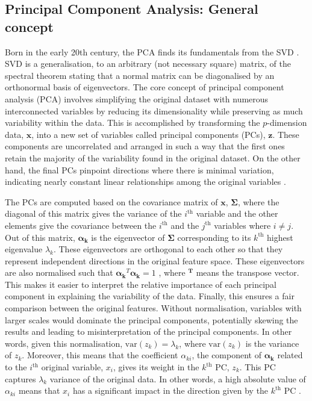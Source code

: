 \subsection{Principal Component Analysis: General concept}
\label{subsec:meth:PCA:PCA}
Born in the early 20th century, the \acrfull{PCA} finds its fundamentals from the \gls{SVD} \cite{pearson1901on,hotelling1933analysis}. \gls{SVD} is a generalisation, to an arbitrary (\ie not necessary square) matrix, of the spectral theorem stating that a normal matrix can be diagonalised by an orthonormal basis of eigenvectors.  The core concept of principal component analysis (PCA) involves simplifying the original dataset with numerous interconnected variables by reducing its dimensionality while preserving as much variability within the data. This is accomplished by transforming the $p$-dimension data, $\mathbf{x}$, into a new set of variables called principal components (PCs), $\mathbf{z}$. These components are uncorrelated and arranged in such a way that the first ones retain the majority of the variability found in the original dataset. On the other hand, the final PCs pinpoint directions where there is minimal variation, indicating nearly constant linear relationships among the original variables \cite{jolliffe2002principal}. 

The PCs are computed based on the covariance matrix of $\mathbf{x}$, $\mathbf{\Sigma}$, where the diagonal of this matrix gives the variance of the $i^{\text{th}}$ variable and the other elements give the covariance between the $i^{\text{th}}$ and the $j^{\text{th}}$ variables where $i\neq j$. Out of this matrix, $\mathbf{\alpha_k}$ is the eigenvector of $\mathbf{\Sigma}$ corresponding to its $k^{\text{th}}$ highest eigenvalue $\lambda_k$. These eigenvectors are orthogonal to each other so that they represent independent directions in the original feature space. These eigenvectors are also normalised such that $\mathbf{\alpha_k}^{T}\mathbf{\alpha_k}=1$ \cite{jolliffe2002principal}, where $\mathbf{^T}$ means the transpose vector. This makes it easier to interpret the relative importance of each principal component in explaining the variability of the data. Finally, this ensures a fair comparison between the original features. Without normalisation, variables with larger scales would dominate the principal components, potentially skewing the results and leading to misinterpretation of the principal components. In other words, given this normalisation, $\mathrm{var}\left(z_k\right)=\lambda_k$, where $\mathrm{var}\left(z_k\right)$ is the variance of $z_k$. Moreover, this means that the coefficient $\alpha_{ki}$, \ie the component of $ \mathbf{\alpha_k}$ related to the $i^{\text{th}}$ original variable, $x_i$,  gives its weight in the $k^{\text{th}}$ PC, \ie $z_k$. This PC captures $\lambda_k$ variance of the original data. In other words, a high absolute value of $\alpha_{ki}$ means that $x_i$ has a significant impact in the direction given by the $k^{\text{th}}$ PC \cite{zdybal2022advancing}. 

